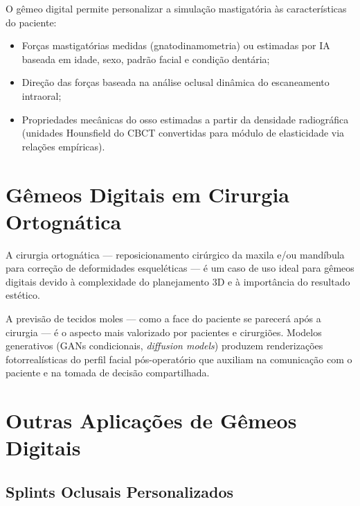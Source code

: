 O gêmeo digital permite personalizar a simulação mastigatória às características do paciente:
\begin{itemize}
    \item Forças mastigatórias medidas (gnatodinamometria) ou estimadas por IA baseada em idade, sexo, padrão facial e condição dentária;
    \item Direção das forças baseada na análise oclusal dinâmica do escaneamento intraoral;
    \item Propriedades mecânicas do osso estimadas a partir da densidade radiográfica (unidades Hounsfield do CBCT convertidas para módulo de elasticidade via relações empíricas).
\end{itemize}

\section{Gêmeos Digitais em Cirurgia Ortognática}

A cirurgia ortognática --- reposicionamento cirúrgico da maxila e/ou mandíbula para correção de deformidades esqueléticas --- é um caso de uso ideal para gêmeos digitais devido à complexidade do planejamento 3D e à importância do resultado estético.


A previsão de tecidos moles --- como a face do paciente se parecerá após a cirurgia --- é o aspecto mais valorizado por pacientes e cirurgiões. Modelos generativos (GANs condicionais, \textit{diffusion models}) produzem renderizações fotorrealísticas do perfil facial pós-operatório que auxiliam na comunicação com o paciente e na tomada de decisão compartilhada.

\section{Outras Aplicações de Gêmeos Digitais}

\subsection{Splints Oclusais Personalizados}

